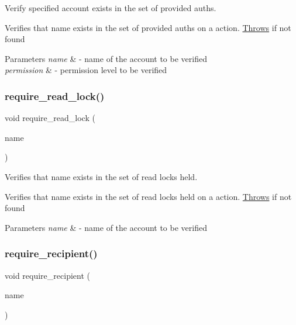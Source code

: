 Verify specified account exists in the set of provided auths. 

Verifies that name exists in the set of provided auths on a action. \mbox{\hyperlink{struct_throws}{Throws}} if not found 
\begin{DoxyParams}{Parameters}
{\em name} & -\/ name of the account to be verified \\
\hline
{\em permission} & -\/ permission level to be verified \\
\hline
\end{DoxyParams}
\mbox{\label{group__actioncapi_ga4b02a9d9adf71ae49e77e19fefc0cbf4}} 
\subsubsection{\texorpdfstring{require\+\_\+read\+\_\+lock()}{require\_read\_lock()}}
{\footnotesize\ttfamily void require\+\_\+read\+\_\+lock (\begin{DoxyParamCaption}\item[{account\+\_\+name}]{name }\end{DoxyParamCaption})}



Verifies that name exists in the set of read locks held. 

Verifies that name exists in the set of read locks held on a action. \mbox{\hyperlink{struct_throws}{Throws}} if not found 
\begin{DoxyParams}{Parameters}
{\em name} & -\/ name of the account to be verified \\
\hline
\end{DoxyParams}
\mbox{\label{group__actioncapi_gae232893c733f02b94dbb70fae39d19f7}} 
\subsubsection{\texorpdfstring{require\+\_\+recipient()}{require\_recipient()}}
{\footnotesize\ttfamily void require\+\_\+recipient (\begin{DoxyParamCaption}\item[{account\+\_\+name}]{name }\end{DoxyParamCaption})}



